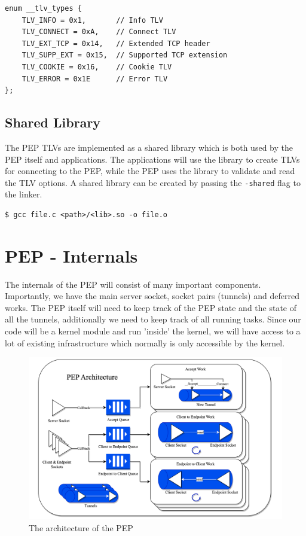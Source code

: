 \documentclass[a4paper,english, 11pt]{report}
\begin{document}
\begin{verbatim}
enum __tlv_types {
    TLV_INFO = 0x1,    	  // Info TLV
    TLV_CONNECT = 0xA,    // Connect TLV          
    TLV_EXT_TCP = 0x14,   // Extended TCP header
    TLV_SUPP_EXT = 0x15,  // Supported TCP extension
    TLV_COOKIE = 0x16,    // Cookie TLV
    TLV_ERROR = 0x1E      // Error TLV
};
\end{verbatim}

\subsection{Shared Library}
The PEP TLVs are implemented as a shared library which is both used by the PEP itself and applications. The applications will use the library to create TLVs for connecting to the PEP, while the PEP uses the library to validate and read the TLV options. 
A shared library can be created by passing the \verb|-shared| flag to the linker.

\begin{verbatim}
$ gcc file.c <path>/<lib>.so -o file.o
\end{verbatim}

\section{PEP - Internals}
The internals of the PEP will consist of many important components. Importantly, we have the main server socket, socket pairs (tunnels) and deferred works. The PEP itself will need to keep track of the PEP state and the state of all the tunnels, additionally we need to keep track of all running tasks. Since our code will be a kernel module and run 'inside' the kernel, we will have access to a lot of existing infrastructure which normally is only accessible by the kernel. 

\begin{figure} %
	\centering
	\includegraphics[scale=0.35]{../diagrams/drawio/pep_architecture.png}
  	\caption{The architecture of the PEP}
  	\label{fig:pep_architecture}
\end{figure}
\end{document}
